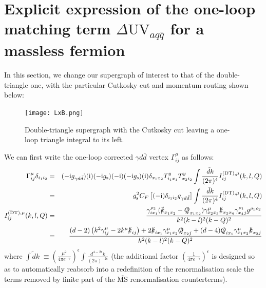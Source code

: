 \documentclass[11pt]{article}
\begin{document}
\section{Explicit expression of the one-loop matching term $\Delta \textrm{UV}_{aq\bar{q}}$ for a massless fermion}
\label{sec::explicitDeltaUVDT}
In this section, we change our supergraph of interest to that of the double-triangle one, with the particular Cutkosky cut and momentum routing shown below:
\begin{figure}[ht!]
\begin{center}
\begin{minipage}{0.65\linewidth}
\centering
{\caption{\label{IntegrationContours} Double-triangle supergraph with the Cutkosky cut leaving a one-loop triangle integral to its left.}}
{\texttt{[image: LxB.png]}}
\end{minipage}\hfill
\end{center}
\end{figure}
We can first write the one-loop corrected $\gamma d \bar{d}$ vertex $\Gamma^\mu_{ij}$ as follows:
\begin{eqnarray}
\Gamma^\mu_{ij}\delta_{i_1 i_2} &=& (-\textrm{i} g_{\gamma d\bar{d}}) (\textrm{i}) (-\textrm{i} g_\textrm{s})(-\textrm{i})(-\textrm{i} g_\textrm{s})(\textrm{i}) \delta_{x_1 x_2} T_{i_1 x_1}^{y} T_{x_2 i_2}^{y} \int \frac{\tilde{d} k}{(2\pi)^4} I^{(\textrm{DT}),\mu}_{ij}(k,l,Q) \nonumber\\
&=& g_\textrm{s}^2 C_F \left [ (-\textrm{i}) \delta_{i_1 i_2} g_{\gamma d\bar{d}} \right] \int \frac{\tilde{d} k}{(2\pi)^4} I^{(\textrm{DT}),\mu}_{ij}(k,l,Q)\nonumber\\
I^{(\textrm{DT}),\mu}_{ij}(k,l,Q) &=& \frac{ \gamma_{i x_1}^{\rho_2} (\slashed{k}_{x_1 x_2}-\slashed{Q}_{x_1 x_2})\gamma^\mu_{x_2 x_3} \slashed{k}_{x_3 x_4} \gamma^{\rho_1}_{x_4 j}g^{\rho_1\rho_2}  }{k^2 (k-l)^2 (k-Q)^2} \nonumber\\
&=& \frac{(d-2) \left( k^2 \gamma^\mu_{ij} -2 k^\mu \slashed{k}_{ij} \right) + 2 \slashed{k}_{i x_1}\gamma^\mu_{x_1 x_2} \slashed{Q}_{x_2 j} + (d-4) \slashed{Q}_{i x_1}\gamma^\mu_{x_1 x_2} \slashed{k}_{x_2 j}   }{k^2 (k-l)^2 (k-Q)^2} \nonumber\\ \label{DUVDT}
\end{eqnarray}
where  $\int \tilde{d}k\; \equiv \left(\frac{\mu^2}{4\pi e^{-\gamma}}\right)^{\epsilon} \int \frac{d^{4-2\epsilon}k}{(2\pi)^{-2\epsilon}} $ (the additional factor $ \left(\frac{1}{4\pi e^{-\gamma}}\right)^{\epsilon} $ is designed so as to automatically reabsorb into a redefinition of the renormalisation scale the terms removed by finite part of the $\overline{\textrm{MS}}$ renormalisation counterterms). 
\end{document}

